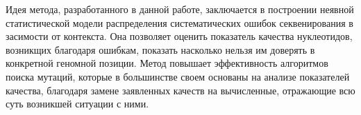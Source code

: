 Идея метода, разработанного в данной работе, заключается в построении неявной статистической модели распределения систематических ошибок секвенирования в засимости от контекста. Она позволяет оценить показатель качества нуклеотидов, возникщих благодаря ошибкам, показать насколько нельзя им доверять в конкретной геномной позиции. Метод повышает эффективность алгоритмов поиска мутаций, которые в большинстве своем основаны на анализе показателей качества, благодаря замене заявленных качеств на вычисленные, отражающие всю суть возникшей ситуации с ними.
